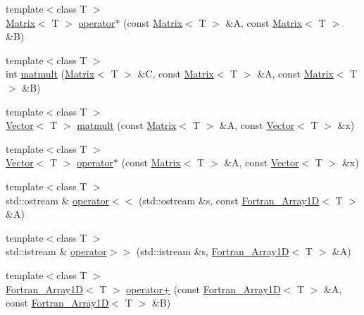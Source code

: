 \begin{DoxyCompactItemize}
\item 
{\footnotesize template$<$class T $>$ }\\\hyperlink{classTNT_1_1Matrix}{Matrix}$<$ T $>$ \hyperlink{namespaceTNT_a3f2fe841addf8cfa323c26ad9d50f010}{operator$\ast$} (const \hyperlink{classTNT_1_1Matrix}{Matrix}$<$ T $>$ \&A, const \hyperlink{classTNT_1_1Matrix}{Matrix}$<$ T $>$ \&B)
\item 
{\footnotesize template$<$class T $>$ }\\int \hyperlink{namespaceTNT_abce6514445cfca8c59b1bec5758c7b08}{matmult} (\hyperlink{classTNT_1_1Matrix}{Matrix}$<$ T $>$ \&C, const \hyperlink{classTNT_1_1Matrix}{Matrix}$<$ T $>$ \&A, const \hyperlink{classTNT_1_1Matrix}{Matrix}$<$ T $>$ \&B)
\item 
{\footnotesize template$<$class T $>$ }\\\hyperlink{classTNT_1_1Vector}{Vector}$<$ T $>$ \hyperlink{namespaceTNT_af5e7c7412c13afcfa68c1b0c71ae1ab6}{matmult} (const \hyperlink{classTNT_1_1Matrix}{Matrix}$<$ T $>$ \&A, const \hyperlink{classTNT_1_1Vector}{Vector}$<$ T $>$ \&x)
\item 
{\footnotesize template$<$class T $>$ }\\\hyperlink{classTNT_1_1Vector}{Vector}$<$ T $>$ \hyperlink{namespaceTNT_aa7eda7fc4788d38da2e89bdd2c77d4bd}{operator$\ast$} (const \hyperlink{classTNT_1_1Matrix}{Matrix}$<$ T $>$ \&A, const \hyperlink{classTNT_1_1Vector}{Vector}$<$ T $>$ \&x)
\item 
{\footnotesize template$<$class T $>$ }\\std\-::ostream \& \hyperlink{namespaceTNT_a875399f3a445f204a22fa78a6166d00d}{operator$<$$<$} (std\-::ostream \&s, const \hyperlink{classTNT_1_1Fortran__Array1D}{Fortran\-\_\-\-Array1\-D}$<$ T $>$ \&A)
\item 
{\footnotesize template$<$class T $>$ }\\std\-::istream \& \hyperlink{namespaceTNT_a4d04329620469ce3ac5a4d774807d8fb}{operator$>$$>$} (std\-::istream \&s, \hyperlink{classTNT_1_1Fortran__Array1D}{Fortran\-\_\-\-Array1\-D}$<$ T $>$ \&A)
\item 
{\footnotesize template$<$class T $>$ }\\\hyperlink{classTNT_1_1Fortran__Array1D}{Fortran\-\_\-\-Array1\-D}$<$ T $>$ \hyperlink{namespaceTNT_a6cda2b90e6bb50b7b8796baafc5d2482}{operator+} (const \hyperlink{classTNT_1_1Fortran__Array1D}{Fortran\-\_\-\-Array1\-D}$<$ T $>$ \&A, const \hyperlink{classTNT_1_1Fortran__Array1D}{Fortran\-\_\-\-Array1\-D}$<$ T $>$ \&B)
\item 

\end{DoxyCompactItemize}
